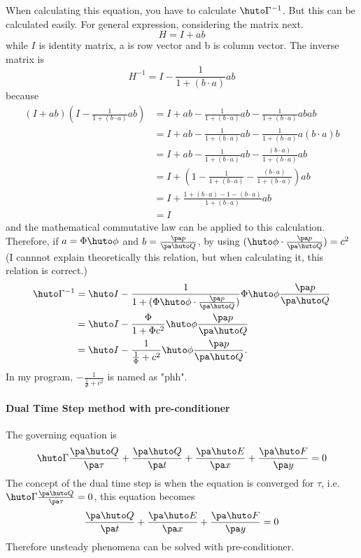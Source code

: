 \documentclass{jsarticle}
\newcommand{\bQ}{\huto Q}
\newcommand{\bI}{\huto I}
\newcommand{\bE}{\huto E}
\newcommand{\bF}{\huto F}
\newcommand{\bG}{\huto \Gamma}
\newcommand{\bp}{\huto \phi}
\begin{document}
When calculating this equation, you have to calculate $\bG ^{-1}$. But this can be calculated easily. For general expression, considering the matrix next.
\begin{equation}
H=I+ab
\end{equation}
while $I$ is identity matrix, a is row vector and b is column vector. The inverse matrix is
\begin{equation}
H^{-1}=I-\frac{1}{1+(b\cdot a)}ab
\end{equation}
because
\begin{equation}
\begin{split}
(I+ab)(I-\frac{1}{1+(b\cdot a)}ab)
&=I+ab-\frac{1}{1+(b\cdot a)}ab-\frac{1}{1+(b\cdot a)}abab\\
&=I+ab-\frac{1}{1+(b\cdot a)}ab-\frac{1}{1+(b\cdot a)}a(b\cdot a)b\\
&=I+ab-\frac{1}{1+(b\cdot a)}ab-\frac{(b\cdot a)}{1+(b\cdot a)}ab\\
&=I+(1-\frac{1}{1+(b\cdot a)}-\frac{(b\cdot a)}{1+(b\cdot a)})ab\\
&=I+\frac{1+(b\cdot a)-1-(b\cdot a)}{1+(b\cdot a)}ab\\
&=I
\end{split}
\end{equation}
and the mathematical commutative law can be applied to this calculation. Therefore, if $a = \Phi \bp$ and $b= \frac{\pa p}{\pa \bQ}$, by using $(\bp \cdot \frac{\pa p}{\pa \bQ}) = c^2$ (I cannnot explain theoretically this relation, but when calculating it, this relation is correct.)
\begin{equation}
\begin{split}
\bG ^{-1} &= \bI -\frac{1}{1+(\Phi \bp \cdot \frac{\pa p}{\pa \bQ})}\Phi \bp \frac{\pa p}{\pa \bQ}\\
&=\bI -\frac{\Phi}{1+\Phi c^2}\bp \frac{\pa p}{\pa \bQ}\\
&=\bI -\frac{1}{\frac 1 \Phi+c^2}\bp \frac{\pa p}{\pa \bQ}.
\end{split}
\end{equation}
In my program, $-\frac{1}{\frac 1 \Phi+c^2}$ is named as "phh".







\paragraph{Dual Time Step method with pre-conditioner}
The governing equation is
\begin{equation}
\bG \frac{\pa \bQ}{\pa \tau} + \frac{\pa \bQ}{\pa t} + \frac{\pa \bE}{\pa x} + \frac{\pa \bF}{\pa y} = 0
\end{equation}
The concept of the dual time step is when the equation is converged for $\tau$, i.e. $\bG \frac{\pa \bQ}{\pa \tau}=0$, this equation becomes
\begin{equation}
\frac{\pa \bQ}{\pa t} + \frac{\pa \bE}{\pa x} + \frac{\pa \bF}{\pa y} = 0
\end{equation}
Therefore unsteady phenomena can be solved with pre-conditioner.
\end{document}
